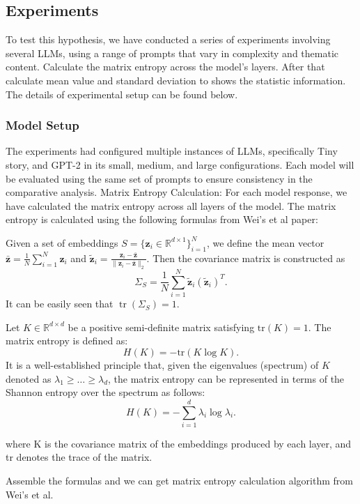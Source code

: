 \documentclass{article}
\begin{document}
\subsection{Experiments}
To test this hypothesis, we have conducted a series of experiments involving several LLMs, using a range of prompts that vary in complexity and thematic content. Calculate the matrix entropy across the model's layers. After that calculate mean value and standard deviation to shows the statistic information. The details of experimental setup can be found below. 

\subsubsection{Model Setup} The experiments had configured multiple instances of LLMs, specifically Tiny story, and GPT-2 in its small, medium, and large configurations. Each model will be evaluated using the same set of prompts to ensure consistency in the comparative analysis.
Matrix Entropy Calculation: For each model response, we have calculated the matrix entropy across all layers of the model. The matrix entropy is calculated using the following formulas from Wei's et al paper:

Given a set of embeddings $S = \{\mathbf{z}_i \in \mathbb{R}^{d \times 1}\}_{i=1}^N$, we define the mean vector $\bar{\mathbf{z}} = \frac{1}{N} \sum_{i=1}^N \mathbf{z}_i$ and $\tilde{\mathbf{z}}_i = \frac{\mathbf{z}_i - \bar{\mathbf{z}}}{\|\mathbf{z}_i - \bar{\mathbf{z}}\|_2}$. Then the covariance matrix is constructed as
\[
\Sigma_S = \frac{1}{N} \sum_{i=1}^N \tilde{\mathbf{z}}_i (\tilde{\mathbf{z}}_i)^T.
\]
It can be easily seen that $\operatorname{tr}(\Sigma_S) = 1$.

Let \( K \in \mathbb{R}^{d \times d} \) be a positive semi-definite matrix satisfying \( \text{tr}(K) = 1 \). The matrix entropy is defined as:
\[
H(K) = -\text{tr}(K \log K).
\]
It is a well-established principle that, given the eigenvalues (spectrum) of \( K \) denoted as \( \lambda_1 \geq \ldots \geq \lambda_d \), the matrix entropy can be represented in terms of the Shannon entropy \cite{Shannon1948} over the spectrum as follows:
\[
H(K) = -\sum_{i=1}^d \lambda_i \log \lambda_i.
\]

where K is the covariance matrix of the embeddings produced by each layer, and 
tr denotes the trace of the matrix.

Assemble the formulas and we can get matrix entropy calculation algorithm from Wei's et al.
\end{document}
